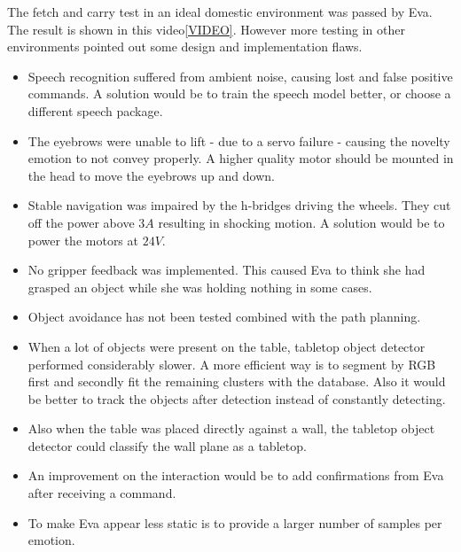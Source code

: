 \documentclass[project_eva.tex]{subfiles}
\begin{document}
The fetch and carry test in an ideal domestic environment was passed by Eva. The result is shown in this video\ref{VIDEO}. However more testing in other environments pointed out some design and implementation flaws.

\begin{itemize}
\item Speech recognition suffered from ambient noise, causing lost and false positive commands. A solution would be to train the speech model better, or choose a different speech package. 
\item The eyebrows were unable to lift - due to a servo failure - causing the novelty emotion to not convey properly. A higher quality motor should be mounted in the head to move the eyebrows up and down.
\item Stable navigation was impaired by the h-bridges driving the wheels. They cut off the power above $3A$ resulting in shocking motion. A solution would be to power the motors at $24V$.
\item No gripper feedback was implemented. This caused Eva to think she had grasped an object while she was holding nothing in some cases.
\item Object avoidance has not been tested combined with the path planning. 
\item When a lot of objects were present on the table, tabletop object detector performed considerably slower. A more efficient way is to segment by RGB first and secondly fit the remaining clusters with the database. Also it would be better to track the objects after detection instead of constantly detecting.
\item Also when the table was placed directly against a wall, the tabletop object detector could classify the wall plane as a tabletop.
\item An improvement on the interaction would be to add confirmations from Eva after receiving a command.
\item To make Eva appear less static is to provide a larger number of samples per emotion.
\end{itemize}
 
\end{document}
